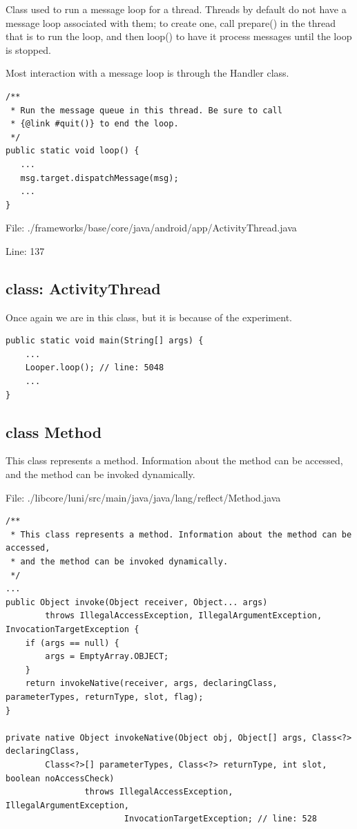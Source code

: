 \documentclass[11pt,a4paper]{article}
\begin{document}
Class used to run a message loop for a thread. Threads by default do not have a message loop associated with them; to create one, call prepare() in the thread that is to run the loop, and then loop() to have it process messages until the loop is stopped.

Most interaction with a message loop is through the Handler class. 

\scriptsize\begin{verbatim}
/**
 * Run the message queue in this thread. Be sure to call
 * {@link #quit()} to end the loop.
 */
public static void loop() {
   ...
   msg.target.dispatchMessage(msg);
   ...
}
\end{verbatim}
\normalsize

File: ./frameworks/base/core/java/android/app/ActivityThread.java

Line: 137


\subsection{class: ActivityThread}

Once again we are in this class, but it is because of the experiment.
\scriptsize
\begin{verbatim}
public static void main(String[] args) {
    ...
    Looper.loop(); // line: 5048
    ...
}
\end{verbatim}
\normalsize


\subsection{class Method}

This class represents a method. Information about the method can be accessed, and the method can be invoked dynamically. 

File: ./libcore/luni/src/main/java/java/lang/reflect/Method.java

\tiny
\begin{verbatim}
/**
 * This class represents a method. Information about the method can be accessed,
 * and the method can be invoked dynamically.
 */
...
public Object invoke(Object receiver, Object... args)
        throws IllegalAccessException, IllegalArgumentException, InvocationTargetException {
    if (args == null) {
        args = EmptyArray.OBJECT;
    }
    return invokeNative(receiver, args, declaringClass, parameterTypes, returnType, slot, flag);
}

private native Object invokeNative(Object obj, Object[] args, Class<?> declaringClass,
        Class<?>[] parameterTypes, Class<?> returnType, int slot, boolean noAccessCheck)
                throws IllegalAccessException, IllegalArgumentException,
                        InvocationTargetException; // line: 528
\end{verbatim}
\normalsize
\end{document}
